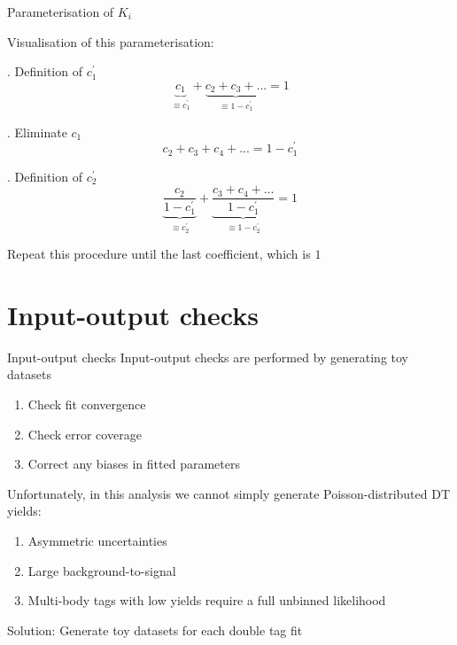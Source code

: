 \documentclass{beamer}
\begin{document}
\begin{frame}{Parameterisation of $K_i$}
  \vspace{0.0cm}
  \begin{center}
  {\large Visualisation of this parameterisation:}
  \end{center}
  \vspace{-0.3cm}
  \begin{center}
    \begin{block}{. Definition of $c_1^\prime$}
      \begin{equation*}
        \underbrace{c_1}_{\equiv c_1^\prime} + \underbrace{c_2 + c_3 + ...}_{\equiv 1 - c_1^\prime} = 1
      \end{equation*}
    \end{block}
    \begin{block}{. Eliminate $c_1$}
      \begin{equation*}
        c_2 + c_3 + c_4 + ... = 1 - c_1^\prime
      \end{equation*}
    \end{block}
    \begin{block}{. Definition of $c_2^\prime$}
      \begin{equation*}
        \underbrace{\frac{c_2}{1 - c_1^\prime}}_{\equiv c_2^\prime} + \underbrace{\frac{c_3 + c_4 + ...}{1 - c_1^\prime}}_{\equiv 1 - c_2^\prime} = 1
      \end{equation*}
    \end{block}
    Repeat this procedure until the last coefficient, which is $1$
  \end{center}
\end{frame}

\section{Input-output checks}
\begin{frame}{Input-output checks}
  \vspace{0.0cm}
  {\large Input-output checks are performed by generating toy datasets}
  \begin{enumerate}
    \item{Check fit convergence}
    \item{Check error coverage}
    \item{Correct any biases in fitted parameters}
  \end{enumerate}
  \vspace{0.5cm}
  {\large Unfortunately, in this analysis we cannot simply generate Poisson-distributed DT yields:}
  \begin{enumerate}
    \item{Asymmetric uncertainties}
    \item{Large background-to-signal}
    \item{Multi-body tags with low yields require a full unbinned likelihood}
  \end{enumerate}
  \vspace{0.5cm}
  \begin{center}
    {\Large Solution: Generate toy datasets for each double tag fit}
  \end{center}
\end{frame}
\end{document}
